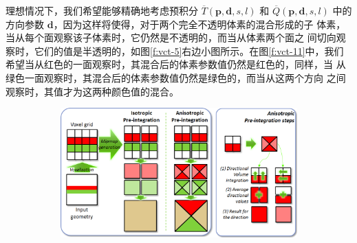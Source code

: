 理想情况下，我们希望能够精确地考虑预积分 $\overline{T}(\mathbf{p},\mathbf{d},s,l)$ 和 $\overline{Q}(\mathbf{p},\mathbf{d},s,l)$ 中的方向参数 $\mathbf{d}$，因为这样将使得，对于两个完全不透明体素的混合形成的子 体素，当从每个面观察该子体素时，它仍然是不透明的，而当从体素两个面之 间切向观察时，它们的值是半透明的，如图\ref{f:vct-5}右边小图所示。在图\ref{f:vct-11}中，我们希望当从红色的一面观察时，其混合后的体素参数值仍然是红色的，同样，当 从绿色一面观察时，其混合后的体素参数值仍然是绿色的，而当从这两个方向 之间观察时，其值才为这两种颜色值的混合。

\begin{figure}
\begin{fullwidth}
	\begin{subfigure}[b]{0.774\thewidth}
		\includegraphics[width=\textwidth]{figures/vct/vct-5-1}
	\end{subfigure}
	\begin{subfigure}[b]{0.215\thewidth}

\end{subfigure}
\end{fullwidth}
\end{figure}
